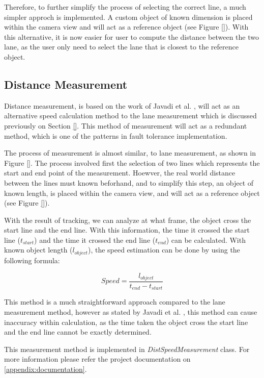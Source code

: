 Therefore, to further simplify the process of selecting the correct line, a much simpler approch is implemented. A custom object of known dimension is placed within the camera view and will act as a reference object (see Figure \ref{}). With this alternative, it is now easier for user to compute the distance between the two lane, as the user only need to select the lane that is closest to the reference object.


\subsection{Distance Measurement}
\label{subsec:distance_measurement}

Distance measurement, is based on the work of Javadi et al. \cite{Javadi2019}, will act as an alternative speed calculation method to the lane measurement which is discussed previously on Section \ref{}. This method of measurement will act as a redundant method, which is one of the patterns in fault tolerance implementation.

The process of measurement is almost similar, to lane measurement, as shown in Figure \ref{}. The process involved first the selection of two lines which represents the start and end point of the measurement. Hoewver, the real world distance between the lines must known beforhand, and to simplify this step, an object of known length, is placed within the camera view, and will act as a reference object (see Figure \ref{}).

With the result of tracking, we can analyze at what frame, the object cross the start line and the end line. With this information, the time it crossed the start line ($t_{start}$) and the time it crossed the end line ($t_{end}$) can be calculated. With known object length ($l_{object}$), the speed estimation can be done by using the following formula:

\begin{equation}
    Speed = \frac{l_{object}}{t_{end} - t_{start}}
\end{equation}

This method is a much straightforward approach compared to the lane measurement method, however as stated by Javadi et al. \cite{Javadi2019}, this method can cause inaccuracy within calculation, as the time taken the object cross the start line and the end line cannot be exactly determined.

This measurement method is implemented in \textit{DistSpeedMeasurement} class. For more information please refer the project documentation on \ref{appendix:documentation}.















